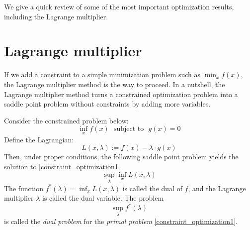 \documentclass[11pt]{book}
\begin{document}
We give a quick review of some of the most important optimization results, including the Lagrange multiplier. 

\section{Lagrange multiplier}
If we add a constraint to a simple minimization problem such as $\min_x f(x)$, the Lagrange multiplier method is the way to proceed. In a nutshell, the Lagrange multiplier method turns a constrained optimization problem into a saddle point problem without constraints by adding more variables. 

Consider  the constrained problem below:
\begin{equation}        
\label{constraint_optimization1}
    \inf_x f(x) ~~~ \textrm{subject to}~~~g(x)=0
\end{equation}
Define the Lagrangian:
\begin{equation}\label{lagrangian}
    L(x,\lambda):= f(x) - \lambda \cdot g(x)
\end{equation}
Then, under proper conditions, the following saddle point problem yields the solution to \eqref{constraint_optimization1}.
\begin{equation}
\sup_{\lambda}\inf_{x}L(x,\lambda)
\end{equation}
The function $f^*(\lambda)=\inf_{x}L(x,\lambda)$ is called the dual of $f$, and the Lagrange multiplier $\lambda$ is called the dual variable. The problem
\begin{equation}\label{prob:dual}
    \sup_{\lambda}f^*(\lambda)
\end{equation}
is called the \emph{dual problem} for the \emph{primal problem} \eqref{constraint_optimization1}.
\end{document}
